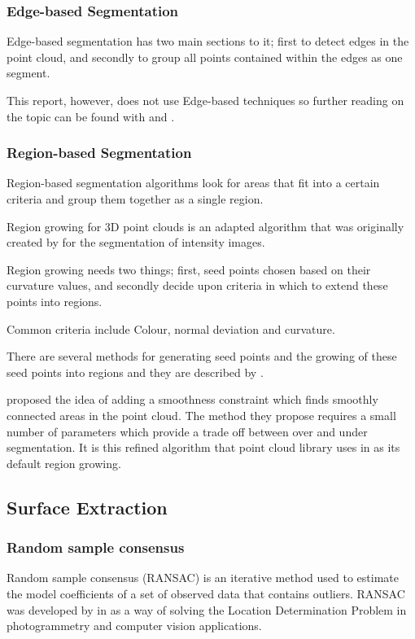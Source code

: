 		
		\subsubsection{Edge-based Segmentation}
		Edge-based segmentation has two main sections to it; first to detect edges in the point cloud, and secondly to group all points contained within the edges as one segment.
		
		This report, however, does not use Edge-based techniques so further reading on the topic can be found with \cite{sappa_fast_2001} and \cite{bhanu_automatic_1986}.
		
		
		\subsubsection{Region-based Segmentation}
		Region-based segmentation algorithms look for areas that fit into a certain criteria and group them together as a single region.
		
		Region growing for 3D point clouds is an adapted algorithm that was originally created by \cite{adams_seeded_1994} for the segmentation of intensity images.
		
		Region growing needs two things; first, seed points chosen based on their curvature values, and secondly decide upon criteria in which to extend these points into regions.
		
		Common criteria include Colour, normal deviation and curvature.
		
		There are several methods for generating seed points and the growing of these seed points into regions and they are described by \cite{hoover_experimental_1996}.
		
		\cite{rabbani_segmentation_2006} proposed the idea of adding a smoothness constraint which finds smoothly connected areas in the point cloud. The method they propose requires a small number of parameters which provide a trade off between over and under segmentation. It is this refined algorithm that point cloud library uses in as its default region growing.
		
	
	\subsection{Surface Extraction}		
	
		\subsubsection{Random sample consensus}
			Random sample consensus (RANSAC) is an iterative method used to estimate the model coefficients of a set of observed data that contains outliers. RANSAC was developed by \citeauthor{fischler_random_1981} in \citeyear{fischler_random_1981} as a way of solving the Location Determination Problem in photogrammetry and computer vision applications.
			
